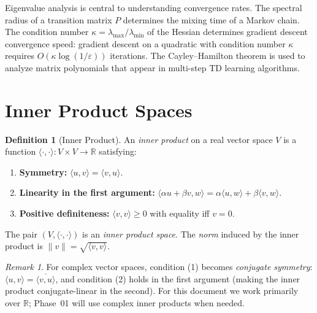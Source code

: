 \documentclass[11pt,a4paper]{article}
\theoremstyle{definition}
\newtheorem{definition}{Definition}[section]
\theoremstyle{plain}
\theoremstyle{remark}
\newtheorem{remark}{Remark}[section]
\newcommand{\R}{\mathbb{R}}
\begin{document}
\begin{rlconnection}
Eigenvalue analysis is central to understanding convergence rates. The spectral radius of
a transition matrix $P$ determines the mixing time of a Markov chain. The condition number
$\kappa = \lambda_{\max}/\lambda_{\min}$ of the Hessian determines gradient descent convergence
speed: gradient descent on a quadratic with condition number $\kappa$ requires
$O(\kappa \log(1/\varepsilon))$ iterations. The Cayley--Hamilton theorem is used to analyze
matrix polynomials that appear in multi-step TD learning algorithms.
\end{rlconnection}

\section{Inner Product Spaces}
\label{sec:inner_product}

\begin{definition}[Inner Product]
\label{def:inner_product}
An \emph{inner product} on a real vector space $V$ is a function
$\langle \cdot, \cdot \rangle: V \times V \to \R$ satisfying:
\begin{enumerate}[nosep]
    \item \textbf{Symmetry:} $\langle u, v \rangle = \langle v, u \rangle$.
    \item \textbf{Linearity in the first argument:} $\langle \alpha u + \beta v, w \rangle
          = \alpha \langle u, w \rangle + \beta \langle v, w \rangle$.
    \item \textbf{Positive definiteness:} $\langle v, v \rangle \geq 0$ with equality iff $v = 0$.
\end{enumerate}
The pair $(V, \langle \cdot, \cdot \rangle)$ is an \emph{inner product space}.
The \emph{norm} induced by the inner product is $\|v\| = \sqrt{\langle v, v \rangle}$.
\end{definition}

\begin{remark}
\label{rem:complex_inner_product}
For complex vector spaces, condition (1) becomes \emph{conjugate symmetry}:
$\langle u, v \rangle = \overline{\langle v, u \rangle}$, and condition (2) holds in
the first argument (making the inner product conjugate-linear in the second). For this
document we work primarily over $\R$; Phase~01 will use complex inner products when needed.
\end{remark}
\end{document}
